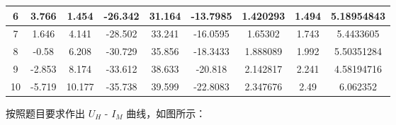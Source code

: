 \documentclass{customDoc}
\begin{document}
\begin{center}
\begin{longtable}{|c|c|c|c|c|c|c|c|c|}
    \hline
    6     & 3.766 & 1.454 & -26.342 & 31.164 & -13.7985 & 1.420293 & 1.494 & 5.18954843 \\
    \hline
    7     & 1.646 & 4.141 & -28.502 & 33.241 & -16.0595 & 1.65302 & 1.743 & 5.4433605 \\
    \hline
    8     & -0.58 & 6.208 & -30.729 & 35.856 & -18.3433 & 1.888089 & 1.992 & 5.50351284 \\
    \hline
    9     & -2.853 & 8.174 & -33.612 & 38.633 & -20.818 & 2.142817 & 2.241 & 4.58194716 \\
    \hline
    10    & -5.719 & 10.177 & -35.738 & 39.599 & -22.8083 & 2.347676 & 2.49  & 6.062352 \\
    \hline
\end{longtable}
\end{center}

\vspace{-20pt}

按照题目要求作出 $U_H$ - $I_M$ 曲线，如图所示：
\end{document}

